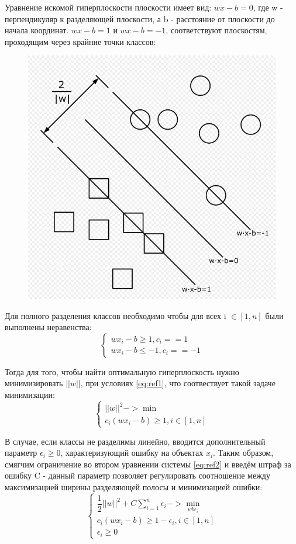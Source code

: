 Уравнение искомой гиперплоскости плоскости имеет вид:
$wx - b = 0$, где w - перпендикуляр к разделяющей плоскости, а b - расстояние от плоскости до начала координат.\newline
$wx - b = 1$ и $wx - b = -1$, соответствуют плоскостям, проходящим через крайние точки классов:
\begin{figure}[!h]
	\centering
	\includegraphics[width=0.5\linewidth,height=0.5\linewidth]{pictures/screenshot021}
	\caption{}
	\label{fig:screenshot021}
\end{figure}

Для полного разделения классов необходимо чтобы для всех i $\in [1, n]$ были выполнены неравенства:
\begin{equation}
\begin{cases}
wx_i - b \ge 1, c_i == 1 \\
wx_i - b \le -1, c_i == -1
\end{cases}
\label{eq:ref1}
\end{equation}

Тогда для того, чтобы найти оптимальную гиперплоскость нужно минимизировать $||w||$, при условиях \ref{eq:ref1}, что соотвествует такой задаче минимизации:
\begin{equation}
\begin{cases}
||w||^2 -> \min \\
c_i(wx_i - b) \ge 1, i \in [1, n]
\end{cases}
\label{eq:ref2}
\end{equation}

В случае, если классы не разделимы линейно, вводится дополнительный параметр $\epsilon_i \ge 0$, характеризующий ошибку на объектах $x_i$. Таким образом, смягчим ограничение во втором уравнении системы \ref{eq:ref2} и введём штраф за ошибку C - данный параметр позволяет регулировать соотношение между максимизацией ширины разделяющей полосы и минимизацией ошибки:
\begin{equation}
\begin{cases}
\dfrac{1}{2}||w||^2 + C\sum_{i=1}^{n}\epsilon_i -> \min_{wb\epsilon_i} \\
c_i(wx_i - b) \ge 1 - \epsilon_i, i \in [1, n] \\
\epsilon_i \ge 0
\end{cases}
\label{eq:ref3}
\end{equation}

